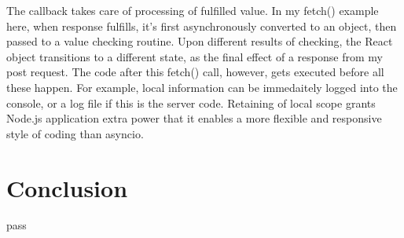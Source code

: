 \documentclass[letterpaper,twocolumn,10pt]{article}
\begin{document}
The callback takes care of processing of fulfilled value.
In my fetch() example here, when response fulfills, it's first asynchronously converted to an object, then passed to a value checking routine.
Upon different results of checking, the React object transitions to a different state, as the final effect of a response from my post request.
The code after this fetch() call, however, gets executed before all these happen.
For example, local information can be immedaitely logged into the console, or a log file if this is the server code.
Retaining of local scope grants Node.js application extra power that it enables a more flexible and responsive style of coding than asyncio.

\section{Conclusion}

pass


% 

\end{document}
